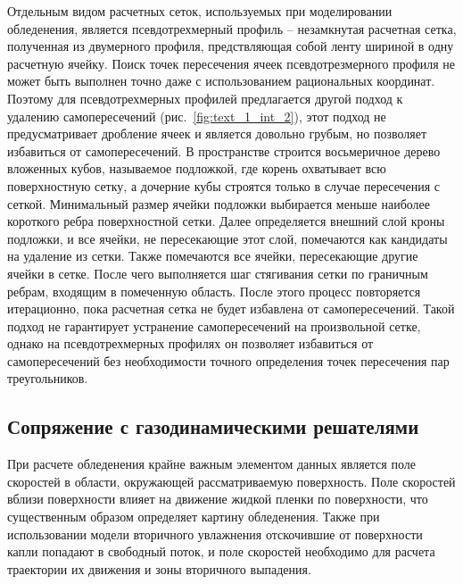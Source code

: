 Отдельным видом расчетных сеток, используемых при моделировании обледенения, является псевдотрехмерный профиль -- незамкнутая расчетная сетка, полученная из двумерного профиля, предствляющая собой ленту шириной в одну расчетную ячейку.
Поиск точек пересечения ячеек псевдотрезмерного профиля не может быть выполнен точно даже с использованием рациональных координат.
Поэтому для псевдотрехмерных профилей предлагается другой подход к удалению самопересечений (рис.~\ref{fig:text_1_int_2}), этот подход не предусматривает дробление ячеек и является довольно грубым, но позволяет избавиться от самопересечений.
В пространстве строится восьмеричное дерево вложенных кубов, называемое подложкой, где корень охватывает всю поверхностную сетку, а дочерние кубы строятся только в случае пересечения с сеткой.
Минимальный размер ячейки подложки выбирается меньше наиболее короткого ребра поверхностной сетки.
Далее определяется внешний слой кроны подложки, и все ячейки, не пересекающие этот слой, помечаются как кандидаты на удаление из сетки.
Также помечаются все ячейки, пересекающие другие ячейки в сетке.
После чего выполняется шаг стягивания сетки по граничным ребрам, входящим в помеченную область.
После этого процесс повторяется итерационно, пока расчетная сетка не будет избавлена от самопересечений.
Такой подход не гарантирует устранение самопересечений на произвольной сетке, однако на псевдотрехмерных профилях он позволяет избавиться от самопересечений без необходимости точного определения точек пересечения пар треугольников.


\subsection{Сопряжение с газодинамическими решателями}\label{sec:text_1_gas}

При расчете обледенения крайне важным элементом данных является поле скоростей в области, окружающей рассматриваемую поверхность.
Поле скоростей вблизи поверхности влияет на движение жидкой пленки по поверхности, что существенным образом определяет картину обледенения.
Также при использовании модели вторичного увлажнения отскочившие от поверхности капли попадают в свободный поток, и поле скоростей необходимо для расчета траектории их движения и зоны вторичного выпадения.

